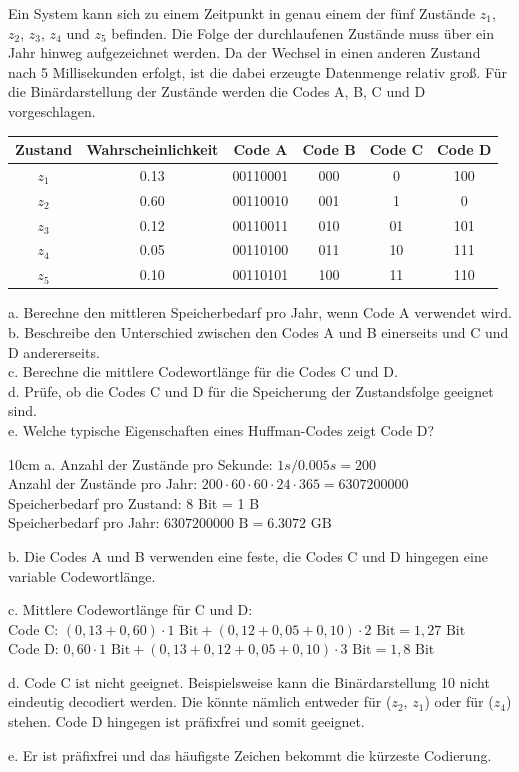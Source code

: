 \question[5]
Ein System kann sich zu einem Zeitpunkt in genau einem der fünf Zustände $z_1$, $z_2$, $z_3$, $z_4$ und $z_5$
befinden. Die Folge der durchlaufenen Zustände muss über ein Jahr hinweg aufgezeichnet werden.
Da der Wechsel in einen anderen Zustand nach 5 Millisekunden erfolgt, ist die dabei erzeugte
Datenmenge relativ groß.
Für die Binärdarstellung der Zustände werden die Codes A, B, C und D vorgeschlagen.


\begin{tabular}{|c|c|c|c|c|c|}
\hline  Zustand & Wahrscheinlichkeit & Code A& Code B&Code C&Code D \\
\hline $z_1$  & 0.13 & 00110001 & 000 & 0 & 100  \\
\hline $z_2$  & 0.60 & 00110010 & 001 & 1 & 0 \\
\hline $z_3$  & 0.12 & 00110011 & 010 & 01 & 101 \\
\hline $z_4$  & 0.05 & 00110100 & 011 & 10 & 111 \\
\hline $z_5$  & 0.10 & 00110101 & 100 & 11 & 110 \\
\hline
\end{tabular}

a. Berechne den mittleren Speicherbedarf pro Jahr, wenn Code A verwendet wird.\\
b. Beschreibe den Unterschied zwischen den Codes A und B einerseits und C und D andererseits.\\
c. Berechne die mittlere Codewortlänge für die Codes C und D.\\
d. Prüfe, ob die Codes C und D für die Speicherung der Zustandsfolge geeignet sind.\\
e. Welche typische Eigenschaften eines Huffman-Codes zeigt Code D?\\
 
\begin{solutionbox}{10cm}
a. Anzahl der Zustände pro Sekunde: $1s / 0.005s = 200$ \\
Anzahl der Zustände pro Jahr: $200 \cdot 60 \cdot 60 \cdot 24 \cdot 365 = 6307200000$ \\
Speicherbedarf pro Zustand: 8 Bit = 1 B  \\
Speicherbedarf pro Jahr: $6 307 200 000 \text{ B} = 6.3072 \text{ GB}$ 

b. Die Codes A und B verwenden eine feste, die Codes C und D hingegen eine variable
Codewortlänge.

c. Mittlere Codewortlänge für C und D: \\
Code C: $(0,13 + 0,60) \cdot 1 \text{ Bit} + (0,12 + 0,05 + 0,10) \cdot 2  \text{ Bit} = 1,27 \text{ Bit}$ \\
Code D: $0,60 \cdot 1 \text{ Bit} + (0,13 + 0,12 + 0,05 + 0,10) \cdot 3 \text{ Bit} = 1,8 \text{ Bit}$

d. Code C ist nicht geeignet. Beispielsweise kann die Binärdarstellung 10 nicht eindeutig decodiert werden.
Die könnte nämlich entweder für ($z_2$, $z_1$) oder für ($z_4$) stehen. Code D hingegen ist präfixfrei und somit geeignet.

e. Er ist präfixfrei und das häufigste Zeichen bekommt die kürzeste Codierung.\\
 
\end{solutionbox}

